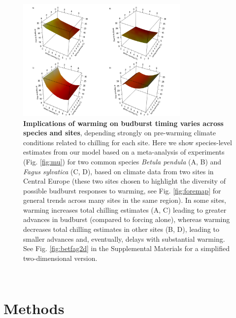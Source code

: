 \documentclass{article}
\begin{document}
\begin{figure}[hp!]
\centering
\noindent \includegraphics[width=0.75\textwidth]{..//..//analyses/bb_analysis/figures/forecasting/tempforecastbothspp_1_7_degwarm3D_utah.png}
\caption{\textbf{Implications of warming on budburst timing varies across species and sites}, depending strongly on pre-warming climate conditions related to chilling for each site. Here we show species-level estimates from our model based on a meta-analysis of experiments (Fig. \ref{fig:mu}) for two common species \emph{Betula pendula} (A, B) and \emph{Fagus sylvatica} (C, D), based on climate data from two sites in Central Europe (these two sites chosen to highlight the diversity of possible budburst responses to warming, see Fig. \ref{fig:foremap} for general trends across many sites in the same region). In some sites, warming increases total chilling estimates (A, C) leading to greater advances in budburst (compared to forcing alone), whereas warming decreases total chilling estimates in other sites (B, D), leading to smaller advances and, eventually, delays with substantial warming. See Fig. \ref{fig:betfag2d} in the Supplemental Materials for a simplified two-dimensional version.}
\label{fig:betfag3d}
\end{figure}\\

\newpage
\pagebreak

\section*{Methods} 
\end{document}
